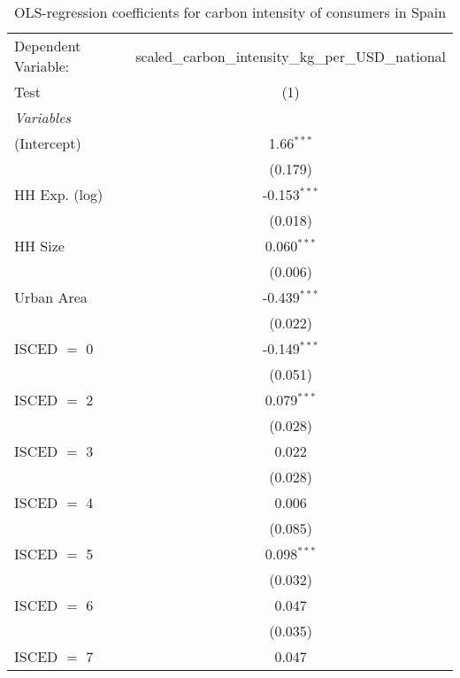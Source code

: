 
\begin{table}[htbp!]
   \centering
   \small
   \begin{adjustbox}{width = 1\textwidth, max height = 0.95\textheight, center}
      \begin{threeparttable}[b]
         \caption{\label{tab:OLS_1_ESP} OLS-regression coefficients for carbon intensity of consumers in Spain}
         \begin{tabular}{lc}
            \tabularnewline \midrule \midrule
            Dependent Variable: & scaled\_carbon\_intensity\_kg\_per\_USD\_national\\        
            Test                & (1)\\  
            \midrule
            \emph{Variables}\\
            (Intercept)         & 1.66$^{***}$\\   
                                & (0.179)\\   
            HH Exp. (log)       & -0.153$^{***}$\\   
                                & (0.018)\\   
            HH Size             & 0.060$^{***}$\\   
                                & (0.006)\\   
            Urban Area          & -0.439$^{***}$\\   
                                & (0.022)\\   
            ISCED $=$ 0         & -0.149$^{***}$\\   
                                & (0.051)\\   
            ISCED $=$ 2         & 0.079$^{***}$\\   
                                & (0.028)\\   
            ISCED $=$ 3         & 0.022\\   
                                & (0.028)\\   
            ISCED $=$ 4         & 0.006\\   
                                & (0.085)\\   
            ISCED $=$ 5         & 0.098$^{***}$\\   
                                & (0.032)\\   
            ISCED $=$ 6         & 0.047\\   
                                & (0.035)\\   
            ISCED $=$ 7         & 0.047\\   

\end{tabular}
\end{threeparttable}
\end{adjustbox}
\end{table}
